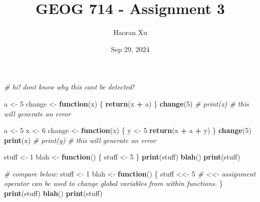 \documentclass[
]{article}
\title{GEOG 714 - Assignment 3}
\author{Haoran Xu}
\date{Sep 29, 2024}
\newenvironment{Shaded}{\begin{snugshade}}{\end{snugshade}}
\newcommand{\CommentTok}[1]{\textcolor[rgb]{0.56,0.35,0.01}{\textit{#1}}}
\newcommand{\ControlFlowTok}[1]{\textcolor[rgb]{0.13,0.29,0.53}{\textbf{#1}}}
\newcommand{\DecValTok}[1]{\textcolor[rgb]{0.00,0.00,0.81}{#1}}
\newcommand{\FunctionTok}[1]{\textcolor[rgb]{0.13,0.29,0.53}{\textbf{#1}}}
\newcommand{\NormalTok}[1]{#1}
\newcommand{\OtherTok}[1]{\textcolor[rgb]{0.56,0.35,0.01}{#1}}
\newcommand{\SpecialCharTok}[1]{\textcolor[rgb]{0.81,0.36,0.00}{\textbf{#1}}}
\begin{document}
\maketitle

\begin{Shaded}
\begin{Highlighting}[]
\CommentTok{\# hi!  don\textquotesingle{}t know why this can\textquotesingle{}t be detected!}

\NormalTok{a }\OtherTok{\textless{}{-}} \DecValTok{5}
\NormalTok{change }\OtherTok{\textless{}{-}} \ControlFlowTok{function}\NormalTok{(x) \{}
    \FunctionTok{return}\NormalTok{(x }\SpecialCharTok{+}\NormalTok{ a)}
\NormalTok{\}}
\FunctionTok{change}\NormalTok{(}\DecValTok{5}\NormalTok{)}
\CommentTok{\# print(x) \# this will generate an error}
\end{Highlighting}
\end{Shaded}

\begin{Shaded}
\begin{Highlighting}[]
\NormalTok{a }\OtherTok{\textless{}{-}} \DecValTok{5}
\NormalTok{x }\OtherTok{\textless{}{-}} \DecValTok{6}
\NormalTok{change }\OtherTok{\textless{}{-}} \ControlFlowTok{function}\NormalTok{(x) \{}
\NormalTok{    y }\OtherTok{\textless{}{-}} \DecValTok{5}
    \FunctionTok{return}\NormalTok{(x }\SpecialCharTok{+}\NormalTok{ a }\SpecialCharTok{+}\NormalTok{ y)}
\NormalTok{\}}
\FunctionTok{change}\NormalTok{(}\DecValTok{5}\NormalTok{)}
\FunctionTok{print}\NormalTok{(x)}
\CommentTok{\# print(y) \# this will generate an error}
\end{Highlighting}
\end{Shaded}

\begin{Shaded}
\begin{Highlighting}[]
\NormalTok{stuff }\OtherTok{\textless{}{-}} \DecValTok{1}
\NormalTok{blah }\OtherTok{\textless{}{-}} \ControlFlowTok{function}\NormalTok{() \{}
\NormalTok{    stuff }\OtherTok{\textless{}{-}} \DecValTok{5}
\NormalTok{\}}
\FunctionTok{print}\NormalTok{(stuff)}
\FunctionTok{blah}\NormalTok{()}
\FunctionTok{print}\NormalTok{(stuff)}

\CommentTok{\# compare below:}
\NormalTok{stuff }\OtherTok{\textless{}{-}} \DecValTok{1}
\NormalTok{blah }\OtherTok{\textless{}{-}} \ControlFlowTok{function}\NormalTok{() \{}
\NormalTok{    stuff }\OtherTok{\textless{}\textless{}{-}} \DecValTok{5}  \CommentTok{\# \textquotesingle{}\textless{}\textless{}{-}\textquotesingle{} assignment operator can be used to change global variables from within functions. }
\NormalTok{\}}
\FunctionTok{print}\NormalTok{(stuff)}
\FunctionTok{blah}\NormalTok{()}
\FunctionTok{print}\NormalTok{(stuff)}
\end{Highlighting}
\end{Shaded}
\end{document}
